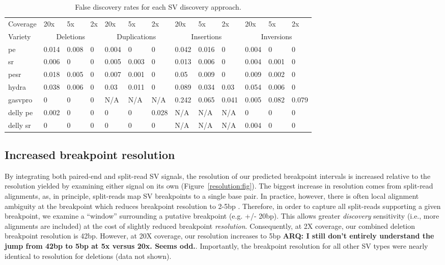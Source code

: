 \documentclass[11pt]{article}
\begin{document}
\begin{table}[h!b!p!]
\small
\caption{False discovery rates for each SV discovery approach.}
\begin{tabular}{l|lll|lll|lll|lll}
		Coverage
		&20x&5x&2x &20x&5x&2x &20x&5x&2x &20x&5x&2x \\
\cline{1-13}
			Variety
			&\multicolumn{3}{c}{Deletions} 
			&\multicolumn{3}{|c}{Duplications} 
			&\multicolumn{3}{|c}{Insertions}
			&\multicolumn{3}{|c}{Inversions} \\
\cline{1-13}
pe		&0.014&0.008&0&0.004&0	  &0    &0.042&0.016&0	  &0.004&0	  &0 \\
sr      &0.006&0	&0&0.005&0.003&0	&0.013&0.006&0	  &0.004&0.001&0 \\
pesr    &0.018&0.005&0&0.007&0.001&0	&0.05 &0.009&0	  &0.009&0.002&0 \\
hydra   &0.038&0.006&0&0.03 &0.011&0	&0.089&0.034&0.03 &0.054&0.006&0 \\
gasvpro &0	  &0	&0&N/A  &N/A  &N/A  &0.242&0.065&0.041&0.005&0.082&0.079 \\
delly pe&0.002&0	&0&0	&0	  &0.028&N/A  &N/A	&N/A  &0	&0	  &0 \\
delly sr&0	  &0	&0&0	&0	  &0	&N/A  &N/A	&N/A  &0.004&0	  &0 \\ 

\end{tabular}
\label{table:fdr}
\end{table}


\subsection{Increased breakpoint resolution}
By integrating both paired-end and split-read SV signals, the resolution of
our predicted breakpoint intervals is increased relative to the resolution 
yielded by examining either signal on its own (Figure~\ref{resolution:fig}). The biggest increase
in resolution comes from split-read alignments, as, in principle, split-reads
map SV breakpoints to a single base pair. In practice, however, there is
often local alignment ambiguity at the breakpoint which reduces breakpoint 
resolution to 2-5bp \cite{quinlan2010b}. Therefore, in order to capture all
split-reads supporting a given breakpoint, we examine a ``window'' surrounding
a putative breakpoint (e.g. +/- 20bp). This allows greater \emph{discovery}
sensitivity (i.e., more alignments are included) at the cost of slightly reduced
breakpoint \emph{resolution}. Consequently, at 2X coverage, our combined
deletion breakpoint resolution is 42bp. However, at 20X coverage, our resolution
increases to 5bp \textbf{ARQ: I still don't entirely understand the jump from
42bp to 5bp at 5x versus 20x.  Seems odd.}. Importantly, the breakpoint 
resolution for all other SV types were nearly identical to resolution for 
deletions (data not shown).
\end{document}
